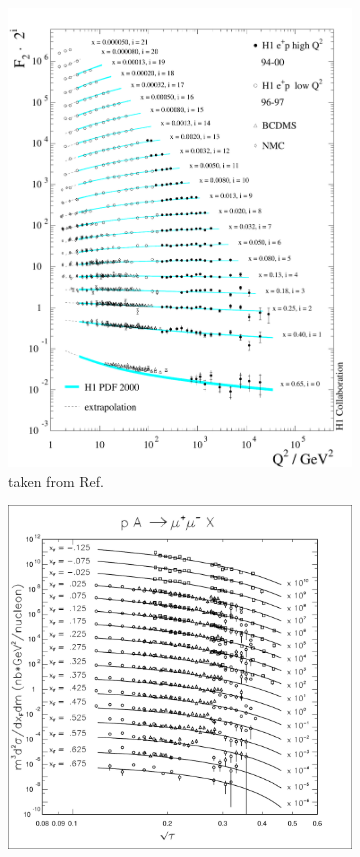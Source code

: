 \begin{figure}
\centering
\begin{subfigure}{0.45\linewidth}
\includegraphics[width=\linewidth]{images/DIS_scaling}
\caption{taken from Ref.\ \cite{theh1collaboration2003}}
\label{subfig:DIS_scaling}
\end{subfigure}
\begin{subfigure}{0.45\linewidth}
\includegraphics[width=\linewidth]{images/DY_scaling}

\end{subfigure}
\end{figure}
